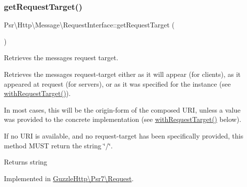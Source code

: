 \mbox{\label{interfacePsr_1_1Http_1_1Message_1_1RequestInterface_a4b9117fe12afd5c5555d3ae7d183ded2}} 
\subsubsection{\texorpdfstring{get\+Request\+Target()}{getRequestTarget()}}
{\footnotesize\ttfamily Psr\textbackslash{}\+Http\textbackslash{}\+Message\textbackslash{}\+Request\+Interface\+::get\+Request\+Target (\begin{DoxyParamCaption}{ }\end{DoxyParamCaption})}

Retrieves the message\textquotesingle{}s request target.

Retrieves the message\textquotesingle{}s request-\/target either as it will appear (for clients), as it appeared at request (for servers), or as it was specified for the instance (see \hyperlink{interfacePsr_1_1Http_1_1Message_1_1RequestInterface_a26d10ad91bf93238d7aa64d5469e06be}{with\+Request\+Target()}).

In most cases, this will be the origin-\/form of the composed U\+RI, unless a value was provided to the concrete implementation (see \hyperlink{interfacePsr_1_1Http_1_1Message_1_1RequestInterface_a26d10ad91bf93238d7aa64d5469e06be}{with\+Request\+Target()} below).

If no U\+RI is available, and no request-\/target has been specifically provided, this method M\+U\+ST return the string \char`\"{}/\char`\"{}.

\begin{DoxyReturn}{Returns}
string 
\end{DoxyReturn}


Implemented in \hyperlink{classGuzzleHttp_1_1Psr7_1_1Request_a0dae2eaf80f250109b69b9e7fb504b3c}{Guzzle\+Http\textbackslash{}\+Psr7\textbackslash{}\+Request}.

\mbox{\label{interfacePsr_1_1Http_1_1Message_1_1RequestInterface_a179c55f570319eb0736f9a8209c9cac6}} 
